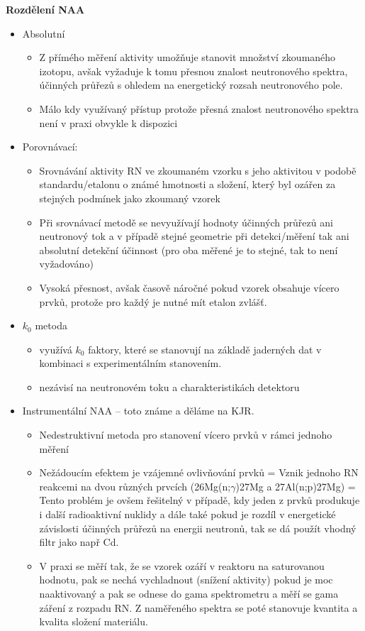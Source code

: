\textbf{Rozdělení NAA}
\begin{itemize}
    \item Absolutní
        \begin{itemize}
            \item Z přímého měření aktivity umožňuje stanovit množství zkoumaného izotopu, avšak vyžaduje k tomu přesnou znalost neutronového spektra, účinných průřezů s ohledem na energetický rozsah neutronového pole.
            \item Málo kdy využívaný přístup protože přesná znalost neutronového spektra není v praxi obvykle k dispozici
        \end{itemize}
    \item Porovnávací:
        \begin{itemize}
            \item Srovnávání aktivity RN ve zkoumaném vzorku s jeho aktivitou v podobě standardu/etalonu o známé hmotnosti a složení, který byl ozářen za stejných podmínek jako zkoumaný vzorek
            \item Při srovnávací metodě se nevyužívají hodnoty účinných průřezů ani neutronový tok a v případě stejné geometrie při detekci/měření tak ani absolutní detekční účinnost (pro oba měřené je to stejné, tak to není vyžadováno)
            \item Vysoká přesnost, avšak časově náročné pokud vzorek obsahuje vícero prvků, protože pro každý je nutné mít etalon zvlášť.
        \end{itemize}
    \item $k_0$ metoda
        \begin{itemize}
            \item využívá $k_0$ faktory, které se stanovují na základě jaderných dat v kombinaci s experimentálním stanovením.
            \item nezávisí na neutronovém toku a charakteristikách detektoru
        \end{itemize}
    \item Instrumentální NAA -- toto známe a děláme na KJR.
        \begin{itemize}
            \item Nedestruktivní metoda pro stanovení vícero prvků v rámci jednoho měření
            \item Nežádoucím efektem je vzájemné ovlivňování prvků = Vznik jednoho RN reakcemi na dvou různých prvcích (26Mg(n;$\gamma$)27Mg a 27Al(n;p)27Mg) = Tento problém je ovšem řešitelný v případě, kdy jeden z prvků produkuje i další radioaktivní nuklidy a dále také pokud je rozdíl v energetické závislosti účinných průřezů na energii neutronů, tak se dá použít vhodný filtr jako např Cd.
            \item V praxi se měří tak, že se vzorek ozáří v reaktoru na saturovanou hodnotu, pak se nechá vychladnout (snížení aktivity) pokud je moc naaktivovaný a pak se odnese do gama spektrometru a měří se gama záření z rozpadu RN. Z naměřeného spektra se poté stanovuje kvantita a kvalita složení materiálu.
        \end{itemize}
\end{itemize}

